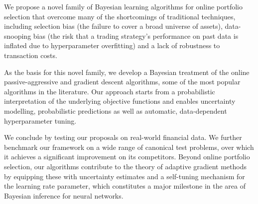 
We propose a novel family of Bayesian learning algorithms for online portfolio selection that overcome many of the shortcomings of traditional techniques, including selection bias (the failure to cover a broad universe of assets), data-snooping bias (the risk that a trading strategy's performance on past data is inflated due to hyperparameter overfitting) and a lack of robustness to transaction costs.

As the basis for this novel family, we develop a Bayesian treatment of the online passive-aggressive and gradient descent algorithms, some of the most popular algorithms in the literature. Our approach starts from a probabilistic interpretation of the underlying objective functions and enables uncertainty modelling, probabilistic predictions as well as automatic, data-dependent hyperparameter tuning.

\begin{mccorrection}
We conclude by testing our proposals on real-world financial data. We further benchmark our framework on a wide range of canonical test problems, over which it achieves a significant improvement on its competitors. Beyond online portfolio selection, our algorithms contribute to the theory of adaptive gradient methods by equipping these with uncertainty estimates and a self-tuning mechanism for the learning rate parameter, which constitutes a major milestone in the area of Bayesian inference for neural networks.
\end{mccorrection}